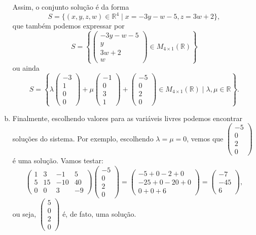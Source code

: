 \documentclass[a4paper,12pt]{article}
\def\R{\mathbb R}
\newenvironment{sol}{\begin{tcolorbox}[breakable,colback=blue!5!white,colframe=blue!40!white,title=\normalsize {\sc{Solução}},coltitle=black]}{\end{tcolorbox}}
\begin{document}
\begin{sol}
\begin{enumerate}[a)]
		Assim, o conjunto solução é da forma
		\[S=\{(x,y,z,w)\in \R^4\mid x=-3y-w-5,z=3w+2\},\]que também podemos expressar por
		\[S=\left\{\begin{pmatrix}
			-3y-w-5\\y\\3w+2\\w
			\end{pmatrix}\in M_{4\times 1}(\R)\right\}\]ou ainda
			\[S=\left\{\lambda\begin{pmatrix}
			-3\\1\\0\\0
			\end{pmatrix}+\mu\begin{pmatrix}
			-1\\0\\3\\1
			\end{pmatrix}+\begin{pmatrix}
			-5\\0\\2\\0
			\end{pmatrix}\in M_{4\times 1}(\R)\mid\lambda,\mu\in \R\right\}.\]
			
		\item Finalmente, escolhendo valores para as variáveis livres podemos encontrar soluções do sistema. Por exemplo, escolhendo $\lambda=\mu=0$, vemos que $\begin{pmatrix}
		-5\\0\\2\\0
		\end{pmatrix}$ é uma solução. Vamos testar:
		\[\begin{pmatrix}
		1&3&-1&5\\5&15&-10&40\\0&0&3&-9
		\end{pmatrix}\begin{pmatrix}
		-5\\0\\2\\0
		\end{pmatrix}=\begin{pmatrix}
		-5+0-2+0\\-25+0-20+0\\0+0+6
		\end{pmatrix}=\begin{pmatrix}
		-7\\-45\\6
		\end{pmatrix},\]ou seja, $\begin{pmatrix}
		5\\0\\2\\0
		\end{pmatrix}$ é, de fato, uma solução.
	\end{enumerate}
\end{sol}
\end{document}
